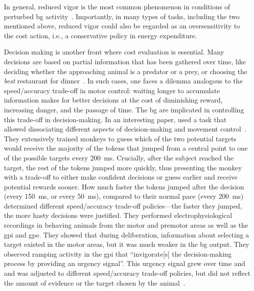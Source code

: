 In general, reduced vigor is the most common phenomenon in conditions of perturbed \gls{bg} activity~\cite{Bailey2006JNeurosci, Rueda2015NN, CastaneAnna2010, Bergstrom2018Cell, Lemke2019NN, Geddes2018Cell, Bailey2006JNeurosci, Hart2018CurrBiol}.
Importantly, in many types of tasks, including the two mentioned above, reduced vigor could also be regarded as an oversensitivity to the cost action, i.e., a conservative policy in energy expenditure.
\par
Decision making is another front where cost evaluation is essential.
Many decisions are based on partial information that has been gathered over time, like deciding whether the approaching animal is a predator or a prey, or choosing the \textit{best} restaurant for dinner~\cite{Bogacz2010TINS}.
In such cases, one faces a dilemma analogous to the speed/accuracy trade-off in motor control: waiting longer to accumulate information makes for better decisions at the cost of diminishing reward, increasing danger, and the passage of time.
The \gls{bg} are implicated in controlling this trade-off in decision-making.
In an interesting paper, \citeauthor{Thura2017Neruon} used a task that allowed dissociating different aspects of decision-making and movement control~\cite{Thura2017Neruon}.
They extensively trained monkeys to guess which of the two potential targets would receive the majority of the tokens that jumped from a central point to one of the possible targets every 200~ms.
Crucially, after the subject reached the target, the rest of the tokens jumped more quickly, thus presenting the monkey with a trade-off to either make confident decisions or guess earlier and receive potential rewards sooner.
How much faster the tokens jumped after the decision (every 150~ms, or every 50~ms), compared to their normal pace (every 200~ms) determined different speed/accuracy trade-off policies---the faster they jumped, the more hasty decisions were justified.
They performed electrophysiological recordings in behaving animals from the motor and premotor areas as well as the \gls{gpi} and \gls{gpe}.
They showed that during deliberation, information about selecting a target existed in the motor areas, but it was much weaker in the \gls{bg} output.
They observed ramping activity in the \gls{gpi} that ``invigorate[s] the decision-making process by providing an urgency signal''.
This urgency signal grew over time and and was adjusted to different speed/accuracy trade-off policies, but did not reflect the amount of evidence or the target chosen by the animal~\cite{Thura2017Neruon}.

